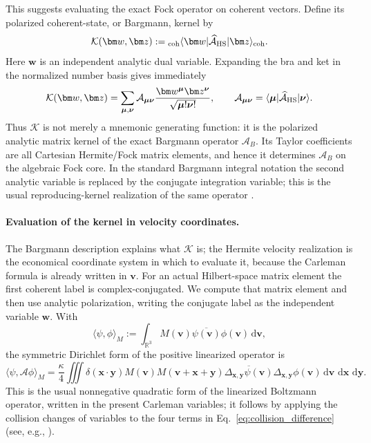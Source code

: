 \documentclass[11pt]{article}
\numberwithin{equation}{section}
\newcommand{\R}{\mathbb R}
\newcommand{\dd}{\,\mathrm d}
\theoremstyle{definition}
\begin{document}
This suggests evaluating the exact Fock operator on coherent vectors.  Define
its polarized coherent-state, or Bargmann, kernel by
\begin{equation}
 \mathcal K(\bm w,\bm z)
 :=
 {}_{\rm coh}\langle\bm w|
 \widehat{\mathcal A}_{\rm HS}
 |\bm z\rangle_{\rm coh}.
 \label{eq:Kdef}
\end{equation}
Here $\bm w$ is an independent analytic dual variable.  Expanding the bra and
ket in the normalized number basis gives immediately
\begin{equation}
 \mathcal K(\bm w,\bm z)
 =
 \sum_{\boldsymbol{\mu},\boldsymbol{\nu}}
 \mathcal A_{\boldsymbol{\mu}\boldsymbol{\nu}}
 \frac{\bm w^{\boldsymbol{\mu}}\bm z^{\boldsymbol{\nu}}}
 {\sqrt{\boldsymbol{\mu}!\boldsymbol{\nu}!}},
 \qquad
 \mathcal A_{\boldsymbol{\mu}\boldsymbol{\nu}}
 =
 \langle\boldsymbol{\mu}|
 \widehat{\mathcal A}_{\rm HS}
 |\boldsymbol{\nu}\rangle.
 \label{eq:Kgenerates}
\end{equation}
Thus $\mathcal K$ is not merely a mnemonic generating function: it is the
polarized analytic matrix kernel of the exact Bargmann operator
$\mathcal A_B$.  Its Taylor coefficients are all Cartesian Hermite/Fock
matrix elements, and hence it determines $\mathcal A_B$ on the algebraic
Fock core.  In the standard Bargmann integral notation the second analytic
variable is replaced by the conjugate integration variable; this is the
usual reproducing-kernel realization of the same operator
\cite{Bargmann1961,Folland1989}.

\paragraph{Evaluation of the kernel in velocity coordinates.}
The Bargmann description explains what $\mathcal K$ is; the Hermite velocity
realization is the economical coordinate system in which to evaluate it,
because the Carleman formula is already written in $\bm v$.
For an actual Hilbert-space matrix element the first coherent label is
complex-conjugated.  We compute that matrix element and then use analytic
polarization, writing the conjugate label as the independent variable
$\bm w$.  With
\begin{equation}
 \langle\psi,\phi\rangle_M
 :=
 \int_{\R^3}
 M(\bm v)\overline{\psi(\bm v)}\phi(\bm v)\dd\bm v,
\end{equation}
the symmetric Dirichlet form of the positive linearized operator is
\begin{equation}
 \langle\psi,\mathcal A\phi\rangle_M
 =\frac{\kappa}{4}
 \iiint
 \delta(\bm x\cdot\bm y)M(\bm v)M(\bm v+\bm x+\bm y)
 \overline{\Delta_{\bm x,\bm y}\psi(\bm v)}
 \Delta_{\bm x,\bm y}\phi(\bm v)
 \dd\bm v\,\dd\bm x\,\dd\bm y.
 \label{eq:carleman_dirichlet_form}
\end{equation}
This is the usual nonnegative quadratic form of the linearized Boltzmann
operator, written in the present Carleman variables; it follows by applying
the collision changes of variables to the four terms in
Eq.~\eqref{eq:collision_difference} (see, e.g.,
\cite{Grad1963,Drange1975}).
\end{document}
